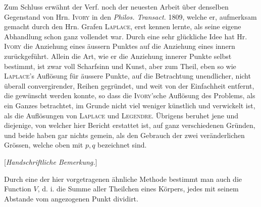 Zum Schluss erwähnt der Verf. noch der neuesten Arbeit über denselben Gegenstand von Hrn. \textsc{Ivory} in den \textit{Philos. Transact.} 1809, welche er, aufmerksam gemacht durch den Hrn. Grafen \textsc{Laplace}, erst kennen lernte, als seine eigene Abhandlung schon ganz vollendet war. Durch eine sehr glückliche Idee hat Hr. \textsc{Ivory} die Anziehung eines äussern Punktes auf die Anziehung eines innern zurückgeführt. Allein die Art, wie er die Anziehung innerer Punkte selbst bestimmt, ist zwar voll Scharfsinn und Kunst, aber zum Theil, eben so wie \textsc{Laplace}'s Auflösung für äussere Punkte, auf die Betrachtung unendlicher, nicht überall convergirender, Reihen gegründet, und weit von der Einfachheit entfernt, die gewünscht werden konnte, so dass die \textsc{Ivory}'sche Auflösung des Problems, als ein Ganzes betrachtet, im Grunde nicht viel weniger künstlich und verwickelt ist, als die Auflösungen von \textsc{Laplace} und \textsc{Legendre}. Übrigens beruhet jene und diejenige, von welcher hier Bericht erstattet ist, auf ganz verschiedenen Gründen, und beide haben gar nichts gemein, als den Gebrauch der zwei veränderlichen Grössen, welche oben mit $p,q$ bezeichnet sind.

\bigskip
\begin{center}
[\textit{Handschriftliche Bemerkung.}]
\end{center}
\medskip
Durch eine der hier vorgetragenen ähnliche Methode bestimmt man auch die Function $V$, d. i. die Summe aller Theilchen eines Körpers, jedes mit seinem Abstande vom angezogenen Punkt dividirt.
